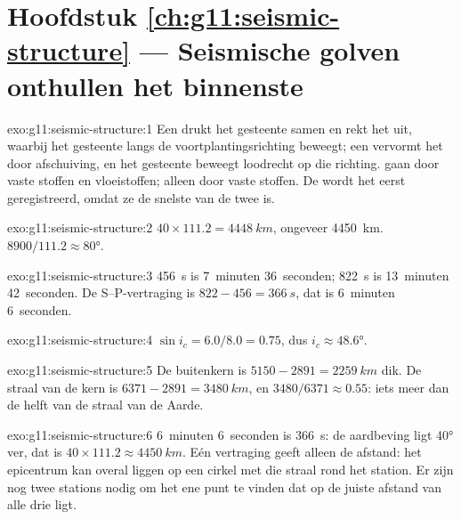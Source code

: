 \section*{Hoofdstuk \ref{ch:g11:seismic-structure} --- Seismische golven onthullen het binnenste}

\begin{solution}{exo:g11:seismic-structure:1}
Een  drukt het gesteente samen en rekt het uit, waarbij het gesteente langs
de voortplantingsrichting beweegt; een  vervormt het door afschuiving, en
het gesteente beweegt loodrecht op die richting.  gaan door vaste stoffen
en vloeistoffen;  alleen door vaste stoffen. De  wordt het eerst
geregistreerd, omdat ze de snelste van de twee is.
\end{solution}

\begin{solution}{exo:g11:seismic-structure:2}
$40 \times 111.2 = \qty{4448}{km}$, ongeveer \qty{4450}{km}. $8900/111.2
\approx \ang{80}$.
\end{solution}

\begin{solution}{exo:g11:seismic-structure:3}
\qty{456}{s} is 7~minuten 36~seconden; \qty{822}{s} is 13~minuten
42~seconden. De S--P-vertraging is $822 - 456 = \qty{366}{s}$, dat is 6~minuten
6~seconden.
\end{solution}

\begin{solution}{exo:g11:seismic-structure:4}
$\sin i_c = 6.0/8.0 = 0.75$, dus $i_c \approx \ang{48.6}$.
\end{solution}

\begin{solution}{exo:g11:seismic-structure:5}
De buitenkern is $5150 - 2891 = \qty{2259}{km}$ dik. De straal van de kern is
$6371 - 2891 = \qty{3480}{km}$, en $3480/6371 \approx 0.55$: iets meer dan de
helft van de straal van de Aarde.
\end{solution}

\begin{solution}{exo:g11:seismic-structure:6}
6~minuten 6~seconden is \qty{366}{s}: de aardbeving ligt \ang{40} ver, dat is
$40 \times 111.2 \approx \qty{4450}{km}$. Eén vertraging geeft alleen de afstand:
het epicentrum kan overal liggen op een cirkel met die straal rond het station.
Er zijn nog twee stations nodig om het ene punt te vinden dat op de juiste afstand
van alle drie ligt.
\end{solution}

